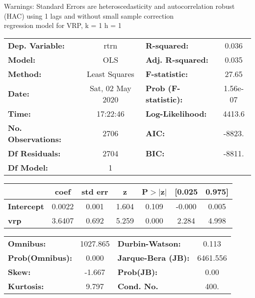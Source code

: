 Warnings: \newline
 [1] Standard Errors are heteroscedasticity and autocorrelation robust (HAC) using 1 lags and without small sample correction\\ 

regression model for VRP, k = 1 h = 1\begin{center}
\begin{tabular}{lclc}
\toprule
\textbf{Dep. Variable:}    &       rtrn       & \textbf{  R-squared:         } &     0.036   \\
\textbf{Model:}            &       OLS        & \textbf{  Adj. R-squared:    } &     0.035   \\
\textbf{Method:}           &  Least Squares   & \textbf{  F-statistic:       } &     27.65   \\
\textbf{Date:}             & Sat, 02 May 2020 & \textbf{  Prob (F-statistic):} &  1.56e-07   \\
\textbf{Time:}             &     17:22:46     & \textbf{  Log-Likelihood:    } &    4413.6   \\
\textbf{No. Observations:} &        2706      & \textbf{  AIC:               } &    -8823.   \\
\textbf{Df Residuals:}     &        2704      & \textbf{  BIC:               } &    -8811.   \\
\textbf{Df Model:}         &           1      & \textbf{                     } &             \\
\bottomrule
\end{tabular}
\begin{tabular}{lcccccc}
                   & \textbf{coef} & \textbf{std err} & \textbf{z} & \textbf{P$> |$z$|$} & \textbf{[0.025} & \textbf{0.975]}  \\
\midrule
\textbf{Intercept} &       0.0022  &        0.001     &     1.604  &         0.109        &       -0.000    &        0.005     \\
\textbf{vrp}       &       3.6407  &        0.692     &     5.259  &         0.000        &        2.284    &        4.998     \\
\bottomrule
\end{tabular}
\begin{tabular}{lclc}
\textbf{Omnibus:}       & 1027.865 & \textbf{  Durbin-Watson:     } &    0.113  \\
\textbf{Prob(Omnibus):} &   0.000  & \textbf{  Jarque-Bera (JB):  } & 6461.556  \\
\textbf{Skew:}          &  -1.667  & \textbf{  Prob(JB):          } &     0.00  \\
\textbf{Kurtosis:}      &   9.797  & \textbf{  Cond. No.          } &     400.  \\
\bottomrule
\end{tabular}
\end{center}

